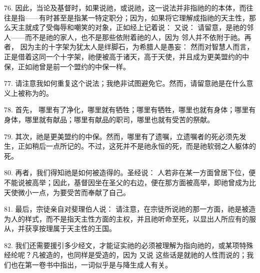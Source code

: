 76. 因此，当论及基督时，如果说祂，或说祂，这一说法并非指祂的的本体，而往往是指——有时甚至是指某一特定职分；因为，如果将它理解成指祂的天主性，那么天主就成了受侮辱和嘲笑的对象，正如经上记着说： 又说： 请留意，是祂的邻人——而不是祂的家人，也不是那些依附着祂的人，因为 邻人并不依附于祂。再者， 因为主的十字架为犹太人是绊脚石，为希腊人是愚妄： 然而对智慧人而言，正是借着这同一个十字架，祂便被高于诸天，高于天使，并且成为更美盟约的中保，正如祂曾是前一个盟约的中保一样。\par

77. 请注意我如何重复这个说法；我绝非试图避免它。然而，请留意祂是在什么意义上被称为的。\par

78. 首先， 哪里有了净化，哪里就有牺牲；哪里有牺牲，哪里也就有身体；哪里有身体，哪里就有献品；哪里有献品的职司，哪里也就有受苦的祭献。\par

79. 其次，祂是更美盟约的中保。然而，哪里有了遗嘱，立遗嘱者的死必须先发生，正如稍后一点所记的。不过，这死并不是祂永恒的死，而是祂软弱之人躯体的死。\par

80. 再者，我们得知祂是如何被造得的。圣经说： 人若非在某一方面曾居下位，便不能说被高举；因此，基督因坐在圣父的右边，便在那方面被高举，即祂曾成为比天使微小一点，为要受苦而奉献了自己。\par

81. 最后，宗徒亲自对斐理伯人说： 请注意，在宗徒所说祂的那一方面，祂是被造为人的样式，而不是指天主性方面的主权，并且祂听命至死，以显出人所应有的服从，并获享按理属于天主性的王国。\par

82. 我们还需要援引多少经文，才能证实祂的必须被理解为指向祂的，或某项特殊经纶呢？凡被造的，也同样是受造的，因为 又说 这些话是就祂的人性而说的；我们也在第一卷书中指出，一词似乎是与降生成人有关。\par

